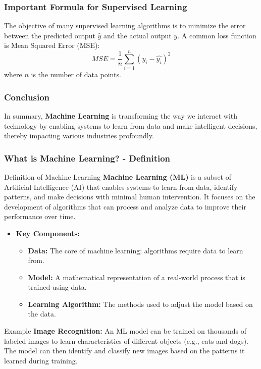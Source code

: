 \documentclass[aspectratio=169]{beamer}
\begin{document}
\begin{frame}[fragile]
    \frametitle{Important Formula for Supervised Learning}
    The objective of many supervised learning algorithms is to minimize the error between the predicted output \( \hat{y} \) and the actual output \( y \). A common loss function is Mean Squared Error (MSE):
    \begin{equation}
        MSE = \frac{1}{n} \sum_{i=1}^{n} (y_i - \hat{y_i})^2
    \end{equation}
    where \( n \) is the number of data points.
\end{frame}

\begin{frame}[fragile]
    \frametitle{Conclusion}
    In summary, \textbf{Machine Learning} is transforming the way we interact with technology by enabling systems to learn from data and make intelligent decisions, thereby impacting various industries profoundly.
\end{frame}

\begin{frame}[fragile]
    \frametitle{What is Machine Learning? - Definition}
    \begin{block}{Definition of Machine Learning}
        \textbf{Machine Learning (ML)} is a subset of Artificial Intelligence (AI) that enables systems to learn from data, identify patterns, and make decisions with minimal human intervention. It focuses on the development of algorithms that can process and analyze data to improve their performance over time.
    \end{block}

    \begin{itemize}
        \item \textbf{Key Components:}
        \begin{itemize}
            \item \textbf{Data:} The core of machine learning; algorithms require data to learn from.
            \item \textbf{Model:} A mathematical representation of a real-world process that is trained using data.
            \item \textbf{Learning Algorithm:} The methods used to adjust the model based on the data.
        \end{itemize}
    \end{itemize}

    \begin{block}{Example}
        \textbf{Image Recognition:} An ML model can be trained on thousands of labeled images to learn characteristics of different objects (e.g., cats and dogs). The model can then identify and classify new images based on the patterns it learned during training.
    \end{block}
\end{frame}
\end{document}
